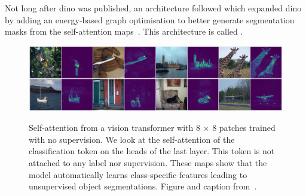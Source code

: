 Not long after \gls{dino} was published, an architecture followed which expanded \gls{dino} by adding an energy-based graph optimisation to better generate segmentation masks from the self-attention maps~\autocite{Hamilton2022}.
This architecture is called .

\begin{figure}[htb]
    \centering
    \includegraphics[width=\textwidth]{pictures/dino-attentionmaps}\\
    \caption[Self-attention Maps of DINO]{Self-attention from a vision transformer with 8 × 8 patches trained with no supervision. We look at the self-attention of the classification token on the heads of the last layer. This token is not attached to any label nor supervision. These maps show that the model automatically learns class-specific features leading to unsupervised object segmentations. Figure and caption from~\autocite{Caron2021}.}
    \label{fig:dino-attentionmaps}
\end{figure}
